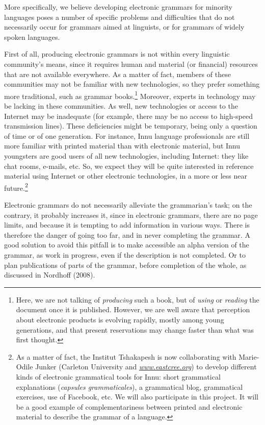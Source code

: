 \documentclass[letterpaper]{article}
\newcommand\textstyleInternetlink[1]{#1}
\begin{document}
More specifically, we believe developing electronic grammars for minority languages poses a number of specific problems and difficulties that do not necessarily occur for grammars aimed at linguists, or for grammars of widely spoken languages. 

First of all, producing electronic grammars is not within every linguistic community{\textquoteright}s means, since it requires human and material (or financial) resources that are not available everywhere. As a matter of fact, members of these communities may not be familiar with new technologies, so they prefer something more traditional, such as grammar books.\footnote{ Here, we are not talking of \textit{producing }such a book, but of \textit{using} or \textit{reading} the document once it is published. However, we are well aware that perception about electronic products is evolving rapidly, mostly among young generations, and that present reservations may change faster than what was first thought.} Moreover, experts in technology may be lacking in these communities. As well, new technologies or access to the Internet may be inadequate (for example, there may be no access to high-speed transmission lines). These deficiencies might be temporary, being only a question of time or of one generation. For instance, Innu language professionals are still more familiar with printed material than with electronic material, but Innu youngsters are good users of all new technologies, including Internet: they like chat rooms, e{}-mails, etc. So, we expect they will be quite interested in reference material using Internet or other electronic technologies, in a more or less near future.\footnote{As a matter of fact, the Institut Tshakapesh is now collaborating with Marie-Odile Junker (Carleton University and \href{http://www.eastcree.org/}{\textstyleInternetlink{\textit{www.eastcree.org}}}) to develop different kinds of electronic grammatical tools for Innu: short grammatical explanations (\textit{capsules grammaticales}), a grammatical blog, grammatical exercises, use of Facebook, etc. We will also participate in this project. It will be a good example of complementariness between printed and electronic material to describe the grammar of a language.} 

Electronic grammars do not necessarily alleviate the grammarian{\textquoteright}s task; on the contrary, it  probably increases it, since in electronic grammars, there are no page limits, and because it is tempting to add information in various ways. There is therefore the danger of going too far, and in never completing the grammar. A good solution to avoid this pitfall is to make accessible an alpha version of the grammar, as work in progress, even if the description is not completed. Or to plan publications of parts of the grammar, before completion of the whole, as discussed in Nordhoff (2008).
\end{document}
